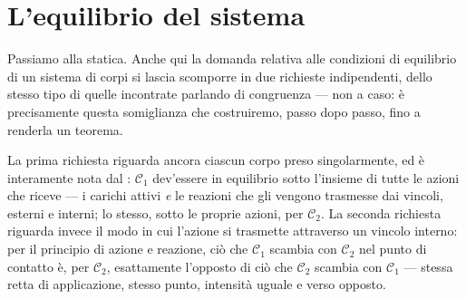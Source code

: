 \section{L'equilibrio del sistema}\label{sec:equilibrio_SCR}

Passiamo alla statica. Anche qui la domanda relativa alle condizioni di equilibrio di un sistema
di corpi si lascia scomporre in due
richieste indipendenti, dello stesso tipo di quelle incontrate parlando
di congruenza --- non a caso: è precisamente questa somiglianza che
costruiremo, passo dopo passo, fino a renderla un teorema.

La prima richiesta riguarda ancora ciascun corpo preso singolarmente, ed
è interamente nota dal : $\mathcal{C}_1$ dev'essere
in equilibrio sotto l'insieme di tutte le azioni che riceve --- i carichi
attivi \emph{e} le reazioni che gli vengono trasmesse dai vincoli, esterni
e interni; lo stesso, sotto le proprie azioni, per $\mathcal{C}_2$. La
seconda richiesta riguarda invece il modo in cui l'azione si trasmette
attraverso un vincolo interno: per il principio di azione e reazione,
ciò che $\mathcal{C}_1$ scambia con $\mathcal{C}_2$ nel punto di contatto
è, per $\mathcal{C}_2$, esattamente l'opposto di ciò che $\mathcal{C}_2$
scambia con $\mathcal{C}_1$ --- stessa retta di applicazione, stesso
punto, intensità uguale e verso opposto. 

%

